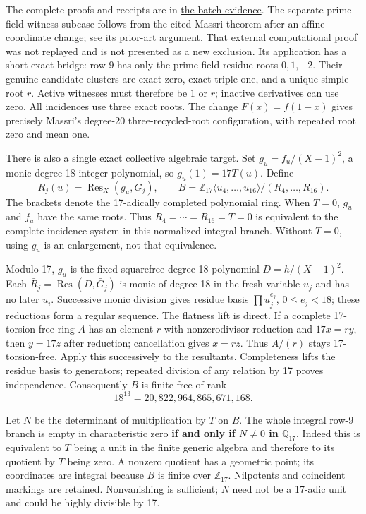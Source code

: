 \documentclass[
  british,
  10pt,
]{article}
\begin{document}
The complete proofs and receipts are in
\href{evidence/full/collective17/exclusions/}{the batch evidence}. The
separate prime-field-witness subcase follows from the cited Massri
theorem after an affine coordinate change; see
\href{evidence/full/collective17/prime-field/PRIOR_ART.md}{its prior-art
argument}. That external computational proof was not replayed and is not
presented as a new exclusion. Its application has a short exact bridge:
row 9 has only the prime-field residue roots \(0,1,-2\). Their
genuine-candidate clusters are exact zero, exact triple one, and a
unique simple root \(r\). Active witnesses must therefore be \(1\) or
\(r\); inactive derivatives can use zero. All incidences use three exact
roots. The change \(F(x)=f(1-x)\) gives precisely Massri's degree-20
three-recycled-root configuration, with repeated root zero and mean one.

There is also a single exact collective algebraic target. Set
\(g_u=f_u/(X-1)^2\), a monic degree-18 integer polynomial, so
\(g_u(1)=17T(u)\). Define \[
 R_j(u)=\operatorname{Res}_X(g_u,G_j),\qquad
 B=\mathbb Z_{17}\langle u_4,\ldots,u_{16}\rangle/(R_4,\ldots,R_{16}).
                                                               \tag{D8}
\] The brackets denote the 17-adically completed polynomial ring. When
\(T=0\), \(g_u\) and \(f_u\) have the same roots. Thus
\(R_4=\cdots=R_{16}=T=0\) is equivalent to the complete incidence system
in this normalized integral branch. Without \(T=0\), using \(g_u\) is an
enlargement, not that equivalence.

Modulo 17, \(g_u\) is the fixed squarefree degree-18 polynomial
\(D=h/(X-1)^2\). Each \(\bar R_j=\operatorname{Res}(D,\bar G_j)\) is
monic of degree 18 in the fresh variable \(u_j\) and has no later
\(u_i\). Successive monic division gives residue basis
\(\prod u_j^{e_j}\), \(0\le e_j<18\); these reductions form a regular
sequence. The flatness lift is direct. If a complete 17-torsion-free
ring \(A\) has an element \(r\) with nonzerodivisor reduction and
\(17x=ry\), then \(y=17z\) after reduction; cancellation gives \(x=rz\).
Thus \(A/(r)\) stays 17-torsion-free. Apply this successively to the
resultants. Completeness lifts the residue basis to generators; repeated
division of any relation by 17 proves independence. Consequently \(B\)
is finite free of rank \[
 18^{13}=20,822,964,865,671,168.
\]

Let \(N\) be the determinant of multiplication by \(T\) on \(B\). The
whole integral row-9 branch is empty in characteristic zero \textbf{if
and only if \(N\ne0\) in \(\mathbb Q_{17}\)}. Indeed this is equivalent
to \(T\) being a unit in the finite generic algebra and therefore to its
quotient by \(T\) being zero. A nonzero quotient has a geometric point;
its coordinates are integral because \(B\) is finite over
\(\mathbb Z_{17}\). Nilpotents and coincident markings are retained.
Nonvanishing is sufficient; \(N\) need not be a 17-adic unit and could
be highly divisible by 17.
\end{document}
